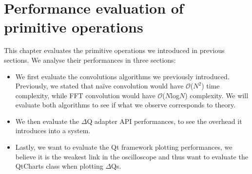 \chapter{Performance evaluation of primitive operations}
    This chapter evaluates the primitive operations we introduced in previous sections. We analyse their performances in three sections:
    \begin{itemize}
        \item We first evaluate the convolutions algorithms we previously introduced. Previously, we stated that naïve convolution would have $\mathcal{O}$($N^2$) time complexity, while FFT convolution would have $\mathcal{O}$($N$log$N$) complexity. We will evaluate both algorithms to see if what we observe corresponds to theory.
        \item We then evaluate the $\Delta$Q adapter API performances, to see the overhead it introduces into a system.
        \item Lastly, we want to evaluate the Qt framework plotting performances, we believe it is the weakest link in the oscilloscope and thus want to evaluate the QtCharts \cite{qt-charts} class when plotting $\Delta$Qs. 
    \end{itemize}

    
    
     
